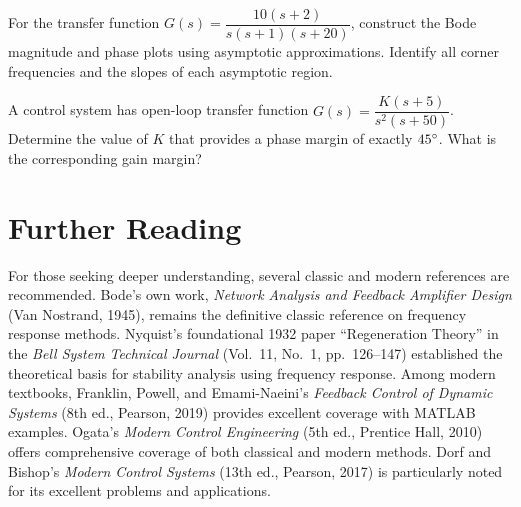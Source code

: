 \begin{exercise}
For the transfer function $G(s) = \dfrac{10(s+2)}{s(s+1)(s+20)}$, construct the Bode magnitude and phase plots using asymptotic approximations. Identify all corner frequencies and the slopes of each asymptotic region.
\end{exercise}

\begin{exercise}
A control system has open-loop transfer function $G(s) = \dfrac{K(s+5)}{s^2(s+50)}$. Determine the value of $K$ that provides a phase margin of exactly $45^\circ$. What is the corresponding gain margin?
\end{exercise}


\section*{Further Reading}

For those seeking deeper understanding, several classic and modern references are recommended. Bode's own work, \textit{Network Analysis and Feedback Amplifier Design} (Van Nostrand, 1945), remains the definitive classic reference on frequency response methods. Nyquist's foundational 1932 paper ``Regeneration Theory'' in the \textit{Bell System Technical Journal} (Vol.\ 11, No.\ 1, pp.\ 126--147) established the theoretical basis for stability analysis using frequency response. Among modern textbooks, Franklin, Powell, and Emami-Naeini's \textit{Feedback Control of Dynamic Systems} (8th ed., Pearson, 2019) provides excellent coverage with MATLAB examples. Ogata's \textit{Modern Control Engineering} (5th ed., Prentice Hall, 2010) offers comprehensive coverage of both classical and modern methods. Dorf and Bishop's \textit{Modern Control Systems} (13th ed., Pearson, 2017) is particularly noted for its excellent problems and applications.

